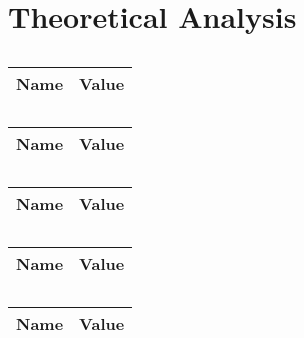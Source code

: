 \section{Theoretical Analysis}
\label{sec:analysis}



\begin{table}[h]
  \centering
  \begin{tabular}{|l|r|}
    \hline    
    {\bf Name} & {\bf Value} \\ \hline
    
  \end{tabular}
  \caption{}
  \label{tab:data}
\end{table}




\begin{table}[h]
  \centering
  \begin{tabular}{|l|r|}
    \hline    
    {\bf Name} & {\bf Value} \\ \hline
    
  \end{tabular}
	\caption{}
  \label{tab:conf}
\end{table}




\begin{table}[h]
  \centering
  \begin{tabular}{|l|r|}
    \hline    
    {\bf Name} & {\bf Value} \\ \hline
    
  \end{tabular}
  \caption{}
  \label{tab:gain}
\end{table}




\begin{table}[h]
  \centering
  \begin{tabular}{|l|r|}
    \hline    
    {\bf Name} & {\bf Value} \\ \hline
    
  \end{tabular}
	\caption{}
  \label{tab:opout}
\end{table}



\begin{table}[h]
  \centering
  \begin{tabular}{|l|r|}
    \hline    
    {\bf Name} & {\bf Value} \\ \hline
    
  \end{tabular}
  \caption{}
  \label{tab:opstage}
\end{table}






